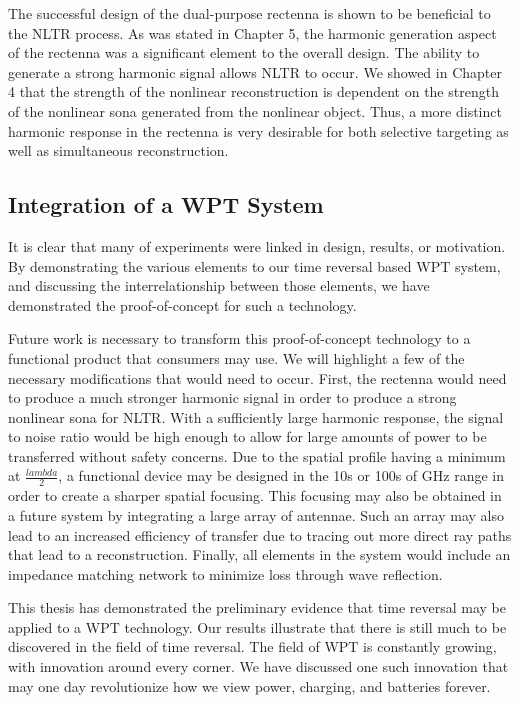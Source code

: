 The successful design of the dual-purpose rectenna is shown to be beneficial to the NLTR process. As was stated in Chapter 5, the harmonic generation aspect of the rectenna was a significant element to the overall design. The ability to generate a strong harmonic signal allows NLTR to occur. We showed in Chapter 4 that the strength of the nonlinear reconstruction is dependent on the strength of the nonlinear sona generated from the nonlinear object. Thus, a more distinct harmonic response in the rectenna is very desirable for both selective targeting as well as simultaneous reconstruction.

\subsection{Integration of a WPT System}

It is clear that many of experiments were linked in design, results, or motivation. By demonstrating the various elements to our time reversal based WPT system, and discussing the interrelationship between those elements, we have demonstrated the proof-of-concept for such a technology. 

Future work is necessary to transform this proof-of-concept technology to a functional product that consumers may use. We will highlight a few of the necessary modifications that would need to occur. First, the rectenna would need to produce a much stronger harmonic signal in order to produce a strong nonlinear sona for NLTR. With a sufficiently large harmonic response, the signal to noise ratio would be high enough to allow for large amounts of power to be transferred without safety concerns. Due to the spatial profile having a minimum at $\frac{lambda}{2}$, a functional device may be designed in the 10s or 100s of GHz range in order to create a sharper spatial focusing. This focusing may also be obtained in a future system by integrating a large array of antennae. Such an array may also lead to an increased efficiency of transfer due to tracing out more direct ray paths that lead to a reconstruction.  Finally, all elements in the system would include an impedance matching network to minimize loss through wave reflection. 

This thesis has demonstrated the preliminary evidence that time reversal may be applied to a WPT technology. Our results illustrate that there is still much to be discovered in the field of time reversal. The field of WPT is constantly growing, with innovation around every corner. We have discussed one such innovation that may one day revolutionize how we view power, charging, and batteries forever.
